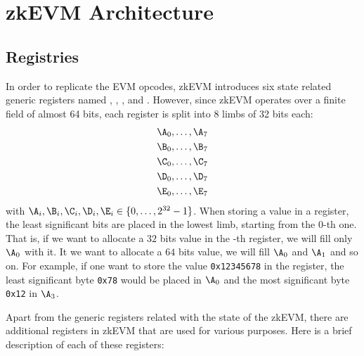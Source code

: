 \section{zkEVM Architecture}


\subsection{Registries}

In order to replicate the EVM opcodes, zkEVM introduces six state related generic registers named \A, \B, \C, \D and \E. However, since zkEVM operates over a finite field of almost 64 bits, each register is split into 8 limbs of 32 bits each: 
\begin{align*}
    &\A_0, \dots,  \A_7 \\
    &\B_0, \dots,  \B_7 \\
    &\C_0, \dots,  \C_7 \\
    &\D_0, \dots,  \D_7 \\
    &\E_0, \dots,  \E_7 \\
\end{align*}
with $\A_i, \B_i, \C_i, \D_i, \E_i \in \{0, \dots, 2^{32} - 1\}$. When storing a value in a register, the least significant bits are placed in the lowest limb, starting from the $0$-th one. That is, if we want to allocate a $32$ bits value in the \A-th register, we will fill only $\A_0$ with it. It we want to allocate a $64$ bits value, we will fill $\A_0$ and $\A_1$ and so on.  For example, if one want to store the value \texttt{0x12345678} in the \A register, the least significant byte \texttt{0x78} would be placed in $\A_0$ and the most significant byte \texttt{0x12} in $\A_3$. 

Apart from the generic registers related with the state of the zkEVM, there are additional registers in zkEVM that are used for various purposes. Here is a brief description of each of these registers:

